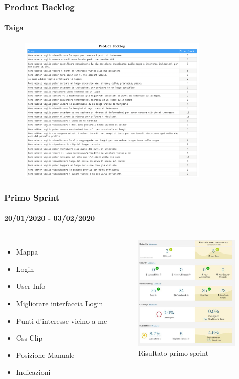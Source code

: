 \documentclass{beamer}
\begin{document}
\begin{frame}
\frametitle{Product Backlog}
\framesubtitle{Taiga}	   
  \begin{figure}[h]
  	\centering 
        \includegraphics[width=9cm]{Images/Taiga/UserStory/backlog.png}
   \end{figure}
\end{frame}

\begin{frame}
\frametitle{Primo Sprint}
\framesubtitle{20/01/2020 - 03/02/2020}
\begin{columns}
  \begin{itemize}
	\item Mappa
	\item Login
	\item User Info
	\item Migliorare interfaccia Login
	\item Punti d'interesse vicino a me
	\item Css Clip
	\item Posizione Manuale
	\item Indicazioni
  \end{itemize}
  \centering  
  \begin{figure}[h]
        \includegraphics[width=5cm]{Images/SonarQube/primo-sprint.png}
        \caption{Risultato primo sprint}
   \end{figure}
\end{columns}
\end{frame}
\end{document}
